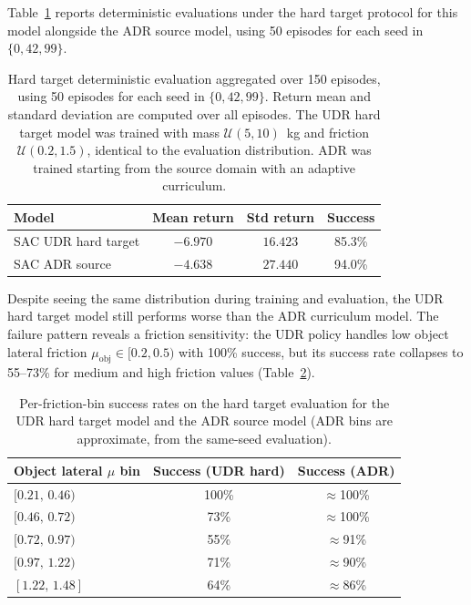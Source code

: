 Table~\ref{tab:udr-vs-adr} reports deterministic evaluations under the hard target protocol for this model alongside the ADR source model, using 50 episodes for each seed in $\{0,42,99\}$.

\begin{table}[H]
\centering
\small
\begin{tabular}{lccc}
\toprule
Model & Mean return & Std return & Success \\
\midrule
SAC UDR hard target & $-6.970$ & $16.423$ & 85.3\% \\
SAC ADR source      & $-4.638$ & $27.440$ & 94.0\% \\
\bottomrule
\end{tabular}
\caption{Hard target deterministic evaluation aggregated over 150 episodes, using 50 episodes for each seed in $\{0,42,99\}$. Return mean and standard deviation are computed over all episodes. The UDR hard target model was trained with mass $\mathcal{U}(5,10)$~kg and friction $\mathcal{U}(0.2,1.5)$, identical to the evaluation distribution. ADR was trained starting from the source domain with an adaptive curriculum.}
\label{tab:udr-vs-adr}
\end{table}

Despite seeing the same distribution during training and evaluation, the UDR hard target model still performs worse than the ADR curriculum model.
The failure pattern reveals a friction sensitivity: the UDR policy handles low object lateral friction $\mu_\mathrm{obj}\in[0.2,0.5)$ with 100\% success, but its success rate collapses to 55--73\% for medium and high friction values (Table~\ref{tab:udr-friction-bins}).

\begin{table}[H]
\centering
\small
\begin{tabular}{lcc}
\toprule
Object lateral $\mu$ bin & Success (UDR hard) & Success (ADR) \\
\midrule
$[0.21,\,0.46)$ & 100\% & $\approx$100\% \\
$[0.46,\,0.72)$ & 73\%  & $\approx$100\% \\
$[0.72,\,0.97)$ & 55\%  & $\approx$91\%  \\
$[0.97,\,1.22)$ & 71\%  & $\approx$90\%  \\
$[1.22,\,1.48]$ & 64\%  & $\approx$86\%  \\
\bottomrule
\end{tabular}
\caption{Per-friction-bin success rates on the hard target evaluation for the UDR hard target model and the ADR source model (ADR bins are approximate, from the same-seed evaluation).}
\label{tab:udr-friction-bins}
\end{table}


